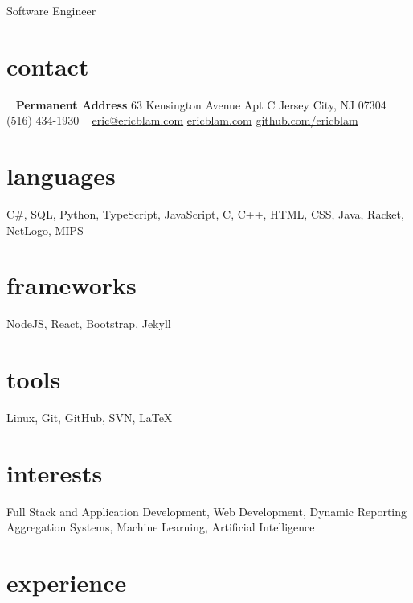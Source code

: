 \documentclass[]{friggeri-cv}
\begin{document}
       {Software Engineer}

\begin{aside}
  \section{contact}
    ~
    \textbf{Permanent Address}
    63 Kensington Avenue
    Apt C
    Jersey City, NJ 07304
    ~
    (516) 434-1930
    ~
    \href{mailto:eric@ericblam.com}{eric@ericblam.com}
    \href{http://ericblam.com}{ericblam.com}
    \href{http://github.com/ericblam}{github.com/ericblam}
  \section{languages}
    C\#, SQL, Python, TypeScript, JavaScript, C, C++, HTML, CSS, Java, Racket, NetLogo, MIPS
  \section{frameworks}
    NodeJS, React, Bootstrap, Jekyll
  \section{tools}
    Linux, Git, GitHub, SVN, \LaTeX
\end{aside}

\section{interests}

Full Stack and Application Development, Web Development, Dynamic Reporting Aggregation Systems, Machine Learning, Artificial Intelligence

\section{experience}
\end{document}
